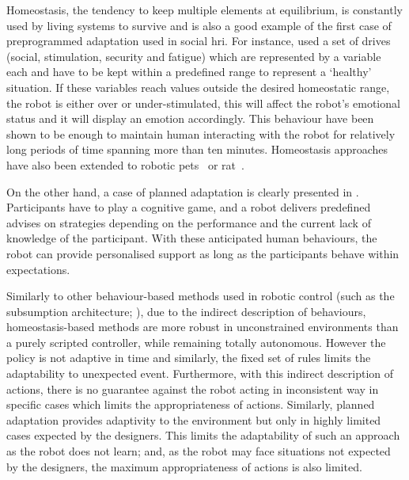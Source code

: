 	
	Homeostasis, the tendency to keep multiple elements at equilibrium, is constantly used by living systems to survive and is also a good example of the first case of preprogrammed adaptation used in social \gls{hri}. For instance, \citet{breazeal1998motivational} used a set of drives (social, stimulation, security and fatigue) which are represented by a variable each and have to be kept within a predefined range to represent a `healthy' situation. If these variables reach values outside the desired homeostatic range, the robot is either over or under-stimulated, this will affect the robot's emotional status and it will display an emotion accordingly. This behaviour have been shown to be enough to maintain human interacting with the robot for relatively long periods of time spanning more than ten minutes. Homeostasis approaches have also been extended to robotic pets~\citep{arkin2003ethological} or \gls{rat}~\citep{cao2017collaborative}.
	
	On the other hand, a case of planned adaptation is clearly presented in \citet{leyzberg2014personalizing}. Participants have to play a cognitive game,  and a robot delivers predefined advises on strategies depending on the performance and the current lack of knowledge of the participant. With these anticipated human behaviours, the robot can provide personalised support as long as the participants behave within expectations. 

	
	Similarly to other behaviour-based methods used in robotic control (such as the subsumption architecture; \citealt{brooks1986robust}), due to the indirect description of behaviours, homeostasis-based methods are more robust in unconstrained environments than a purely scripted controller, while remaining totally autonomous. However the policy is not adaptive in time and similarly, the fixed set of rules limits the adaptability to unexpected event. Furthermore, with this indirect description of actions, there is no guarantee against the robot acting in inconsistent way in specific cases which limits the appropriateness of actions. Similarly, planned adaptation provides adaptivity to the environment but only in highly limited cases expected by the designers. This limits the adaptability of such an approach as the robot does not learn; and, as the robot may face situations not expected by the designers, the maximum appropriateness of actions is also limited.

